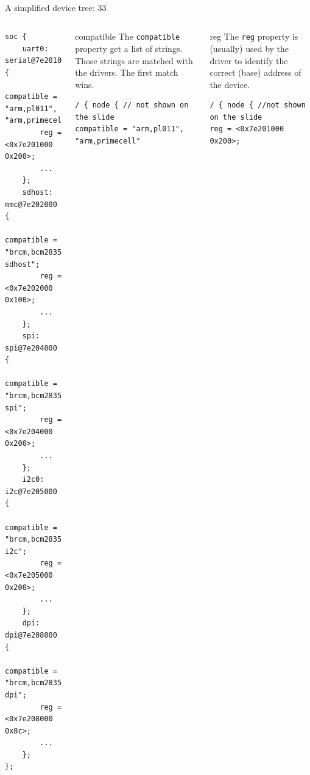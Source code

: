 \documentclass[aspectratio=169]{beamer}
\newcommand{\sectiontitle}{}
\begin{document}
\begin{frame}[fragile]{A simplified device tree: 33\textsuperscript{}}{\sectiontitle}
\begin{columns}[T]
\begin{verbatim}
soc {
	uart0: serial@7e201000 {
		compatible = "arm,pl011", "arm,primecell";
		reg = <0x7e201000 0x200>;
		...
	};
	sdhost: mmc@7e202000 {
		compatible = "brcm,bcm2835-sdhost";
		reg = <0x7e202000 0x100>;
		...
	};
	spi: spi@7e204000 {
		compatible = "brcm,bcm2835-spi";
		reg = <0x7e204000 0x200>;
		...
	};
	i2c0: i2c@7e205000 {
		compatible = "brcm,bcm2835-i2c";
		reg = <0x7e205000 0x200>;
		...
	};
	dpi: dpi@7e208000 {
		compatible = "brcm,bcm2835-dpi";
		reg = <0x7e208000 0x8c>;
		...
	};
};
\end{verbatim}
\begin{block}{compatible}
The \verb|compatible| property get a list of strings. Those strings are matched with the drivers. The first match wins.
\begin{verbatim}
/ { node { // not shown on the slide
compatible = "arm,pl011", "arm,primecell"
\end{verbatim}
\end{block}
\begin{block}{reg}
The \verb|reg| property is (usually) used by the driver to identify the correct (base) address of the device.
\begin{verbatim}
/ { node { //not shown on the slide
reg = <0x7e201000 0x200>;
\end{verbatim}
\end{block}
\end{columns}
\end{frame}
\end{document}
